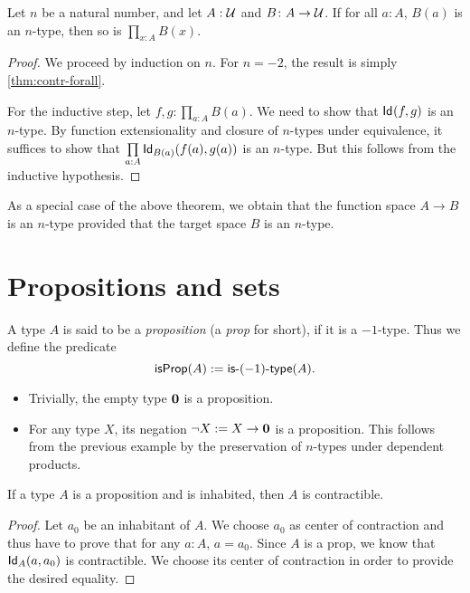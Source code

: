\begin{thm}\label{thm:hlevel-prod}
 Let $n$ be a natural number, and let $A : \type$ and $B \colon A \to \type$.
     If for all $a : A$, $B(a)$ is an $n$-type, then so is $\prod\limits_{x : A} B(x)$.
\end{thm}

\begin{proof}
  We proceed by induction on $n$.
  For $n = -2$, the result is simply \autoref{thm:contr-forall}.

  For the inductive step, let $f, g : \prod\limits_{a:A}B(a)$.
  We need to show that $\idtype{f}{g}$ is an $n$-type.
  By function extensionality and closure of $n$-types under equivalence, it suffices to show that $\prod\limits_{a : A} \idtype[B(a)]{f(a)}{g(a)}$ is an $n$-type.
  But this follows from the inductive hypothesis.
\end{proof}

\noindent
As a special case of the above theorem, we obtain that the function space $A \to B$ is an $n$-type
provided that the target space $B$ is an $n$-type.

\section{Propositions and sets}

\begin{defn}\label{defn:h-prop}
 A type $A$ is said to be a \emph{proposition} (a \emph{prop} for short), if it is a $-1$-type.
  Thus we define the predicate
 \[\isprop (A) := \istype{(-1)}(A)  .\]
\end{defn}

\begin{egs}\hfill
 \begin{itemize}
  \item Trivially, the empty type $\emptyt$ is a proposition.
  \item For any type $X$, its negation $\neg X := X \to \emptyt$ is a proposition. This follows from the previous example by the preservation of $n$-types under dependent products.
 \end{itemize}
\end{egs}

\begin{thm}\label{thm:hprop-inhab-contr}
 If a type $A$ is a proposition and is inhabited, then $A$ is contractible.
\end{thm}

\begin{proof}
 Let $a_0$ be an inhabitant of $A$. We choose $a_0$ as center of contraction and thus have to
  prove that for any $a : A$, $a = a_0$.
  Since $A$ is a prop, we know that $\idtype[A]{a}{a_0}$ is contractible.
  We choose its center of contraction in order to provide the desired equality.
\end{proof}

